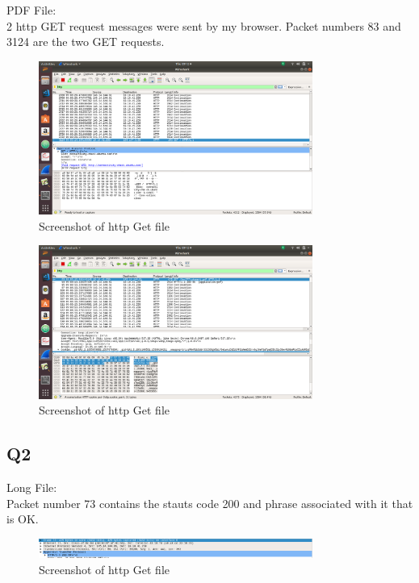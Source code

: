 \documentclass{article}
\begin{document}
 PDF File:\\
2 http GET request messages were sent by my browser. Packet numbers 83 and 3124 are the two GET requests.\\

  \begin{figure}[H]
 \centering
 \includegraphics[width=0.8\textwidth]{../Set3/q1/b.png}
 \caption{\label{fig:PING}Screenshot of http Get file}
 \end{figure}
 
   \begin{figure}[H]
 \centering
 \includegraphics[width=0.8\textwidth]{../Set3/q1/c.png}
 \caption{\label{fig:PING}Screenshot of http Get file}
 \end{figure}

\subsection{Q2}

Long File: \\
Packet number 73 contains the stauts code 200 and phrase associated with it that is OK.\\
  \begin{figure}[H]
 \centering
 \includegraphics[width=0.8\textwidth]{../Set3/q2/a.png}
 \caption{\label{fig:PING}Screenshot of http Get file}
 \end{figure}
 
\end{document}
